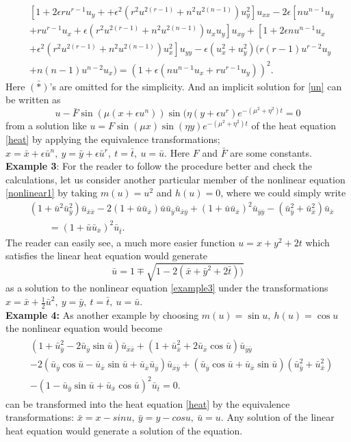 \documentclass[a4paper]{article}
\def\bea{\begin{eqnarray}}
\def\eea{\end{eqnarray}}
\def\be{\begin{equation}}
\def\ee{\end{equation}}
\def\bes{\begin{equation*}}
\def\ees{\end{equation*}}
\begin{document}
\be
\label{un}
\begin{split}
& \left[ 1+2 \epsilon r u^{r-1} u_y + + \epsilon^2 (r^2 u^{2(r-1)}+n^2 u^{2(n-1)}) u_y^2\right] u_{xx} 
 -2 \epsilon \left[ n u^{n-1} u_y \right. \\
 &  \left. +r u^{r-1} u_x + \epsilon (r^2 u^{2(r-1)}+n^2 u^{2(n-1)})u_x u_y\right] u_{xy} + \left[ 1+ 2 \epsilon n u^{n-1} u_x \right. \\
 & \left.  + \epsilon^2 (r^2 u^{2(r-1)}+n^2 u^{2(n-1)})u_x^2 \right] u_{yy} 
  -\epsilon (u_x^2+u_y^2) (r(r-1) u^{r-2} u_y \\
  & + n(n-1) u^{n-2} u_x )  = (1+\epsilon (n u^{n-1} u_x+ r u^{r-1} u_y))^2.
\end{split}
\ee
Here $\bar {(*)} $'s are omitted for the simplicity. And an implicit solution for \eqref{un} can be written as 
\bes
 u-  \bar F \sin{( \mu ( x +\epsilon u^n ))} \sin{( \eta (y+ \epsilon u^r)} e^{-(\mu^2+\eta^2) t}=0
\ees
from a solution like $ 
 u= F \sin{( \mu x )} \sin{( \eta y)} e^{-(\mu^2+\eta^2)t}$ 
 of the heat equation \eqref{heat} by applying the equivalence transformations; $x= \bar x+ \epsilon\bar u^n,\ y=\bar y+ \epsilon \bar u^r ,\ t=\bar t,\ u=\bar u$.   Here $F$ and $\bar F$ are some constants.\\
 {\bf Example 3}: For the reader to follow the procedure better and  check the calculations, let us  consider another particular member of the nonlinear equation \eqref{nonlinear1} by taking $m(u)=u^2$ and $h(u)=0$, where we could simply write
 \be
 \label{example3}
\begin{split}
 &(1+\bar u^2\bar u_{\bar y}^2)\bar u_{\bar x \bar x}
 -2(1+ \bar u\bar u_{\bar x})\bar u\bar u_{\bar y}\bar u_{\bar x\bar y}
  +(1+\bar u\bar u_{\bar x})^2
 \bar u_{\bar y\bar y} 
-(\bar u_{\bar y}^2+\bar u_{\bar x}^2)\bar u_{\bar x}
 \\
&\qquad  =(1+\bar u\bar u_{\bar x})^2\bar u_{\bar t}.
 \end{split}
 \ee
The reader can easily see, a  much more easier function $  u=x+ y^2+2  t$ which satisfies the linear heat equation would generate     
  \bes \bar u=1 \mp \sqrt{1-2( \bar
x+\bar y^2 +2 \bar t))}
\ees
as a solution to the nonlinear equation \eqref{example3} under the transformations $x= \bar x+ \frac{1}{2}\bar u^2,\ y=\bar y,\ t=\bar t,\ u=\bar u$.  \\
 {\bf Example 4:} As another example by 
  choosing  $m(u)=\sin u,\ h(u)=\cos u$ the nonlinear equation would become
  \bea
\begin{split}
&(1+ \bar u_{\bar y}^2-2 \bar u_{\bar y}\sin \bar u )\bar u_{\bar x\bar x}+(1+ \bar u_{\bar x}^2+2\bar u_{\bar x}\cos \bar u )\bar u_{\bar y\bar y}\\
&-2(\bar u_{\bar y}\cos \bar u - \bar
u_{\bar x}\sin \bar u+ \bar u_{\bar x}\bar u_{\bar y}) \bar
u_{\bar x\bar y}+ (\bar u_{\bar y}\cos \bar u +\bar u_{\bar x}\sin
\bar u )(
\bar u_{\bar y}^2+\bar u_{\bar x}^2)\\
&-(1- \bar u_{\bar y} \sin \bar u +\bar u_{\bar x} \cos \bar u )^2 \bar u_{\bar t}=0.
\end{split}
\eea 
can be transformed into the heat equation \eqref{heat} by the equivalence transformations: 
$\bar x=x- sin u,\ \bar y=y- cos u,\ \bar u=u$. Any solution of the linear heat equation would generate a solution of the equation. 
\end{document}
